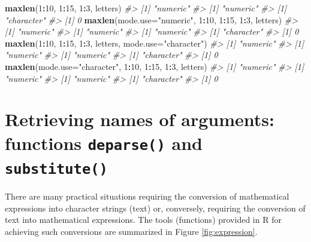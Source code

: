 \documentclass[
]{book}
\newenvironment{Shaded}{\begin{snugshade}}{\end{snugshade}}
\newcommand{\AttributeTok}[1]{\textcolor[rgb]{0.13,0.29,0.53}{#1}}
\newcommand{\CommentTok}[1]{\textcolor[rgb]{0.56,0.35,0.01}{\textit{#1}}}
\newcommand{\DecValTok}[1]{\textcolor[rgb]{0.00,0.00,0.81}{#1}}
\newcommand{\FunctionTok}[1]{\textcolor[rgb]{0.13,0.29,0.53}{\textbf{#1}}}
\newcommand{\NormalTok}[1]{#1}
\newcommand{\SpecialCharTok}[1]{\textcolor[rgb]{0.81,0.36,0.00}{\textbf{#1}}}
\newcommand{\StringTok}[1]{\textcolor[rgb]{0.31,0.60,0.02}{#1}}
\begin{document}
\begin{Shaded}
\begin{Highlighting}[]
\FunctionTok{maxlen}\NormalTok{(}\DecValTok{1}\SpecialCharTok{:}\DecValTok{10}\NormalTok{, }\DecValTok{1}\SpecialCharTok{:}\DecValTok{15}\NormalTok{, }\DecValTok{1}\SpecialCharTok{:}\DecValTok{3}\NormalTok{, letters)}
\CommentTok{\#\textgreater{} [1] "numeric"}
\CommentTok{\#\textgreater{} [1] "numeric"}
\CommentTok{\#\textgreater{} [1] "character"}
\CommentTok{\#\textgreater{} [1] 0}
\FunctionTok{maxlen}\NormalTok{(}\AttributeTok{mode.use=}\StringTok{"numeric"}\NormalTok{, }\DecValTok{1}\SpecialCharTok{:}\DecValTok{10}\NormalTok{, }\DecValTok{1}\SpecialCharTok{:}\DecValTok{15}\NormalTok{, }\DecValTok{1}\SpecialCharTok{:}\DecValTok{3}\NormalTok{, letters)}
\CommentTok{\#\textgreater{} [1] "numeric"}
\CommentTok{\#\textgreater{} [1] "numeric"}
\CommentTok{\#\textgreater{} [1] "numeric"}
\CommentTok{\#\textgreater{} [1] "character"}
\CommentTok{\#\textgreater{} [1] 0}
\FunctionTok{maxlen}\NormalTok{(}\DecValTok{1}\SpecialCharTok{:}\DecValTok{10}\NormalTok{, }\DecValTok{1}\SpecialCharTok{:}\DecValTok{15}\NormalTok{, }\DecValTok{1}\SpecialCharTok{:}\DecValTok{3}\NormalTok{, letters, }\AttributeTok{mode.use=}\StringTok{"character"}\NormalTok{)}
\CommentTok{\#\textgreater{} [1] "numeric"}
\CommentTok{\#\textgreater{} [1] "numeric"}
\CommentTok{\#\textgreater{} [1] "numeric"}
\CommentTok{\#\textgreater{} [1] "character"}
\CommentTok{\#\textgreater{} [1] 0}
\FunctionTok{maxlen}\NormalTok{(}\AttributeTok{mode.use=}\StringTok{"character"}\NormalTok{, }\DecValTok{1}\SpecialCharTok{:}\DecValTok{10}\NormalTok{, }\DecValTok{1}\SpecialCharTok{:}\DecValTok{15}\NormalTok{, }\DecValTok{1}\SpecialCharTok{:}\DecValTok{3}\NormalTok{, letters)}
\CommentTok{\#\textgreater{} [1] "numeric"}
\CommentTok{\#\textgreater{} [1] "numeric"}
\CommentTok{\#\textgreater{} [1] "numeric"}
\CommentTok{\#\textgreater{} [1] "character"}
\CommentTok{\#\textgreater{} [1] 0}
\end{Highlighting}
\end{Shaded}

\section{\texorpdfstring{Retrieving names of arguments: functions \texttt{deparse()} and \texttt{substitute()}}{Retrieving names of arguments: functions deparse() and substitute()}}\label{retrieving-names-of-arguments-functions-deparse-and-substitute}

There are many practical situations requiring the conversion of mathematical expressions into character strings (text) or, conversely, requiring the conversion of text into mathematical expressions. The tools (functions) provided in R for achieving such conversions are summarized in Figure \ref{fig:expression}.
\end{document}

